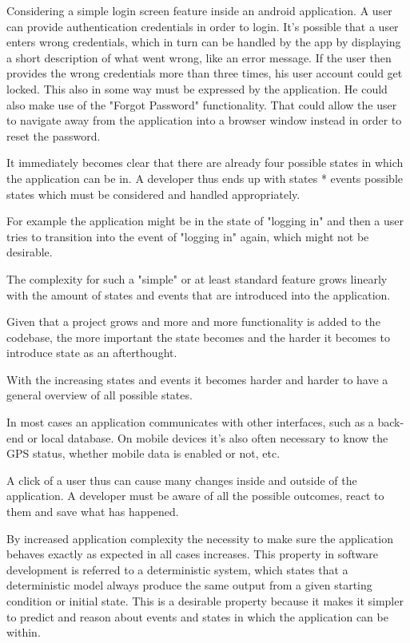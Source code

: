 Considering a simple login screen feature inside an android application. A user can provide authentication credentials
in order to login. It's possible that a user enters wrong credentials, which in turn can be handled by the app by displaying
a short description of what went wrong, like an error message.
If the user then provides the wrong credentials more than three times, his user account could get locked. 
This also in some way must be expressed by the application.
He could also make use of the "Forgot Password" functionality. That could allow the user to navigate away from the application
into a browser window instead in order to reset the password.


It immediately becomes clear that there are already four possible states in which the application can be in.
A developer thus ends up with states * events possible states which must be considered and handled appropriately.

For example the application might be in the state of "logging in" and then a user tries to transition into
the event of "logging in" again, which might not be desirable.
 
The complexity for such a "simple" or at least standard feature grows linearly with the amount
of states and events that are introduced into the application.

Given that a project grows and more and more functionality is added to the codebase, the more 
important the state becomes and the harder it becomes to introduce state as an afterthought.


With the increasing states and events it becomes harder and harder to have a general overview of all
possible states.

In most cases an application communicates with other interfaces, such as a back-end or local database.
On mobile devices it's also often necessary to know the GPS status, whether mobile data is enabled or not, etc. 

A click of a user thus can cause many changes inside and outside of the application.
A developer must be aware of all the possible outcomes, react to them and save what has happened.

By increased application complexity the necessity to make sure the application behaves exactly
as expected in all cases increases. This property in software development is referred to a deterministic system, 
which states that a deterministic model always produce the same output from a given starting
condition or initial state. This is a desirable property because it makes it simpler to predict and reason about events and states
in which the application can be within.

